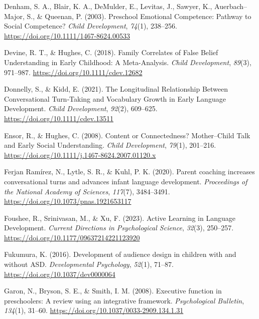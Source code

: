 \documentclass[
  english,
  12pt,
  man,floatsintext]{apa6}
\newlength{\cslhangindent}
\newenvironment{CSLReferences}[2] %
 {\begin{list}{}{%
  \setlength{\itemindent}{0pt}
  \setlength{\leftmargin}{0pt}
  \setlength{\parsep}{0pt}
  \ifodd #1
   \setlength{\leftmargin}{\cslhangindent}
   \setlength{\itemindent}{-1\cslhangindent}
  \fi
  \setlength{\itemsep}{#2\baselineskip}}}
 {\end{list}}
\begin{document}
\begin{CSLReferences}{1}{0}
Denham, S. A., Blair, K. A., DeMulder, E., Levitas, J., Sawyer, K., Auerbach--Major, S., \& Queenan, P. (2003). Preschool {Emotional Competence}: {Pathway} to {Social Competence}? \emph{Child Development}, \emph{74}(1), 238--256. \url{https://doi.org/10.1111/1467-8624.00533}

Devine, R. T., \& Hughes, C. (2018). Family {Correlates} of {False Belief Understanding} in {Early Childhood}: {A Meta-Analysis}. \emph{Child Development}, \emph{89}(3), 971--987. \url{https://doi.org/10.1111/cdev.12682}

Donnelly, S., \& Kidd, E. (2021). The {Longitudinal Relationship Between Conversational Turn}‐{Taking} and {Vocabulary Growth} in {Early Language Development}. \emph{Child Development}, \emph{92}(2), 609--625. \url{https://doi.org/10.1111/cdev.13511}

Ensor, R., \& Hughes, C. (2008). Content or {Connectedness}? {Mother}--{Child Talk} and {Early Social Understanding}. \emph{Child Development}, \emph{79}(1), 201--216. \url{https://doi.org/10.1111/j.1467-8624.2007.01120.x}

Ferjan Ramírez, N., Lytle, S. R., \& Kuhl, P. K. (2020). Parent coaching increases conversational turns and advances infant language development. \emph{Proceedings of the National Academy of Sciences}, \emph{117}(7), 3484--3491. \url{https://doi.org/10.1073/pnas.1921653117}

Foushee, R., Srinivasan, M., \& Xu, F. (2023). Active {Learning} in {Language Development}. \emph{Current Directions in Psychological Science}, \emph{32}(3), 250--257. \url{https://doi.org/10.1177/09637214221123920}

Fukumura, K. (2016). Development of audience design in children with and without {ASD}. \emph{Developmental Psychology}, \emph{52}(1), 71--87. \url{https://doi.org/10.1037/dev0000064}

Garon, N., Bryson, S. E., \& Smith, I. M. (2008). Executive function in preschoolers: {A} review using an integrative framework. \emph{Psychological Bulletin}, \emph{134}(1), 31--60. \url{https://doi.org/10.1037/0033-2909.134.1.31}


\end{CSLReferences}
\end{document}
